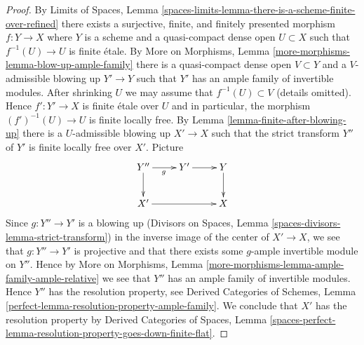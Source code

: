 \documentclass[10pt,a4paper]{amsart}
\theoremstyle{plain}
\theoremstyle{definition}
\theoremstyle{remark}
\numberwithin{equation}{subsection}
\begin{document}
\begin{proof}
By Limits of Spaces, Lemma
\ref{spaces-limits-lemma-there-is-a-scheme-finite-over-refined}
there exists a surjective, finite, and finitely presented morphism
$f : Y \to X$ where $Y$ is a scheme and a quasi-compact dense open
$U \subset X$ such that $f^{-1}(U) \to U$ is finite \'etale.
By More on Morphisms, Lemma \ref{more-morphisms-lemma-blow-up-ample-family}
there is a quasi-compact dense open $V \subset Y$ and a $V$-admissible
blowing up $Y' \to Y$ such that $Y'$ has an ample family of invertible
modules. After shrinking $U$ we may assume that $f^{-1}(U) \subset V$
(details omitted). Hence $f' : Y' \to X$ is finite \'etale over $U$
and in particular, the morphism $(f')^{-1}(U) \to U$ is finite locally free.
By Lemma \ref{lemma-finite-after-blowing-up} there is a $U$-admissible
blowing up $X' \to X$ such that the strict transform $Y''$ of $Y'$
is finite locally free over $X'$. Picture
$$
\xymatrix{
Y'' \ar[d] \ar[r]_g &
Y' \ar[r] &
Y \ar[d] \\
X' \ar[rr] & & X
}
$$
Since $g : Y'' \to Y'$ is a blowing up
(Divisors on Spaces, Lemma \ref{spaces-divisors-lemma-strict-transform})
in the inverse image of the center of $X' \to X$, we see that
$g : Y'' \to Y'$ is projective and that there exists some 
$g$-ample invertible module on $Y''$. Hence by
More on Morphisms, Lemma \ref{more-morphisms-lemma-ample-family-ample-relative}
we see that $Y''$ has an ample family of invertible modules.
Hence $Y''$ has the resolution property, see
Derived Categories of Schemes, Lemma
\ref{perfect-lemma-resolution-property-ample-family}.
We conclude that $X'$ has the resolution property
by
Derived Categories of Spaces, Lemma
\ref{spaces-perfect-lemma-resolution-property-goes-down-finite-flat}.
\end{proof}
\end{document}

